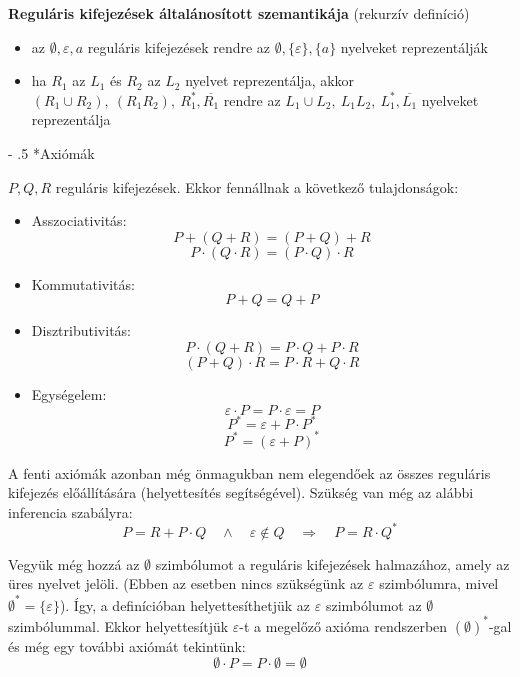 \documentclass[12pt,margin=0px]{article}
\makeatletter
\renewcommand\paragraph{%
	\@startsection{paragraph}{4}{0mm}%
	{-\baselineskip}%
	{.5\baselineskip}%
	{\normalfont\normalsize\bfseries}}
\makeatother
\begin{document}
{    \noindent \textbf{Reguláris kifejezések általánosított szemantikája} (rekurzív definíció)
    \begin{itemize}
        \item az $\emptyset, \varepsilon, a$ reguláris kifejezések rendre az $\emptyset, \{\varepsilon\}, \{a\}$ nyelveket reprezentálják
        \item ha $R_1$ az $L_1$ és $R_2$ az $L_2$ nyelvet reprezentálja, akkor $(R_1 \cup R_2),\ (R_1R_2),\ R_1^{*}, \overline{R_1}$ rendre az $L_1 \cup L_2,\ L_1L_2,\ L_1^{*}, \overline{L_1}$ nyelveket reprezentálja
    \end{itemize}

	\paragraph*{Axiómák}

    \noindent $P,Q,R$ reguláris kifejezések. Ekkor fennállnak a következő tulajdonságok:
    \begin{itemize}
        \item Asszociativitás:
            \[
                P+(Q+R) = (P+Q)+R
            \]
            \[
                P\cdot(Q\cdot R) = (P\cdot Q)\cdot R
            \]
			\item Kommutativitás:
            \[
                P+Q = Q+P
            \]
			\item Disztributivitás:
            \[
                P\cdot (Q+R) = P\cdot Q + P\cdot R
            \]
			\[
                (P+Q)\cdot R = P\cdot R + Q\cdot R
            \]
			\item Egységelem:
            \[
                \varepsilon\cdot P = P\cdot\varepsilon = P
            \]
            \[
                P^* = \varepsilon + P \cdot P^*
            \]
			\[
                P^* = (\varepsilon+P)^*
            \]
        \end{itemize}
							
    \noindent A fenti axiómák azonban még önmagukban nem elegendőek az összes reguláris kifejezés előállítására (helyettesítés segítségével). Szükség van még az alábbi inferencia szabályra:
    \[
        P=R+P\cdot Q \quad \land \quad \varepsilon \notin Q \quad \Longrightarrow \quad P = R\cdot Q^*
    \]
							
    \noindent Vegyük még hozzá az $\emptyset$ szimbólumot a reguláris kifejezések halmazához, amely az üres nyelvet jelöli. (Ebben az esetben nincs szükségünk az $\varepsilon$ szimbólumra, mivel $\emptyset^* = \{\varepsilon\}$). Így, a definícióban helyettesíthetjük az $\varepsilon$ szimbólumot az $\emptyset$ szimbólummal. Ekkor helyettesítjük $\varepsilon$-t a megelőző axióma rendszerben $(\emptyset)^*$-gal és még egy további axiómát tekintünk:
    \[
        \emptyset\cdot P = P\cdot\emptyset = \emptyset
    \]

}
\end{document}
